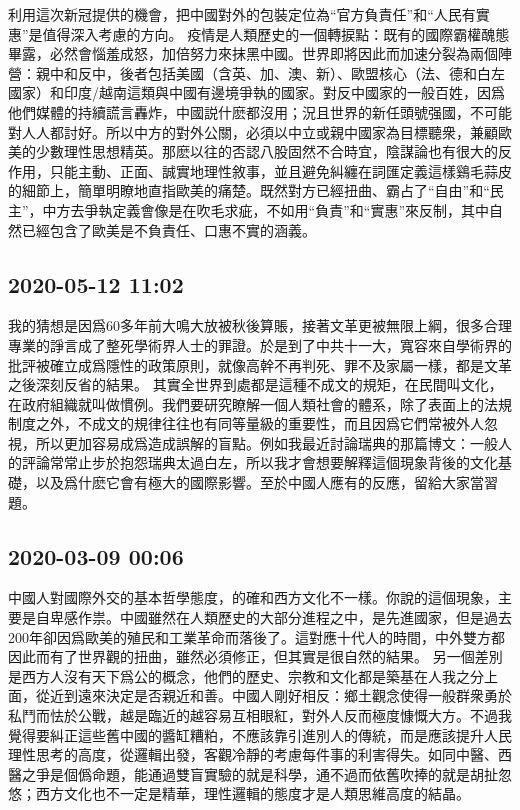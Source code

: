 \documentclass[twocolumn]{ctexart}
\begin{document}
利用這次新冠提供的機會，把中國對外的包裝定位為“官方負責任”和“人民有實惠”是值得深入考慮的方向。 
疫情是人類歷史的一個轉捩點：既有的國際霸權醜態畢露，必然會惱羞成怒，加倍努力來抹黑中國。世界即將因此而加速分裂為兩個陣營：親中和反中，後者包括美國（含英、加、澳、新）、歐盟核心（法、德和白左國家）和印度/越南這類與中國有邊境爭執的國家。對反中國家的一般百姓，因爲他們媒體的持續謊言轟炸，中國説什麽都沒用；況且世界的新任頭號强國，不可能對人人都討好。所以中方的對外公關，必須以中立或親中國家為目標聽衆，兼顧歐美的少數理性思想精英。那麽以往的否認八股固然不合時宜，陰謀論也有很大的反作用，只能主動、正面、誠實地理性敘事，並且避免糾纏在詞匯定義這樣鷄毛蒜皮的細節上，簡單明瞭地直指歐美的痛楚。既然對方已經扭曲、霸占了“自由”和“民主”，中方去爭執定義會像是在吹毛求疵，不如用“負責”和“實惠”來反制，其中自然已經包含了歐美是不負責任、口惠不實的涵義。
\subsection*{2020-05-12 11:02}

我的猜想是因爲60多年前大鳴大放被秋後算賬，接著文革更被無限上綱，很多合理專業的諍言成了整死學術界人士的罪證。於是到了中共十一大，寬容來自學術界的批評被確立成爲隱性的政策原則，就像高幹不再判死、罪不及家屬一樣，都是文革之後深刻反省的結果。 
其實全世界到處都是這種不成文的規矩，在民間叫文化，在政府組織就叫做慣例。我們要研究瞭解一個人類社會的體系，除了表面上的法規制度之外，不成文的規律往往也有同等量級的重要性，而且因爲它們常被外人忽視，所以更加容易成爲造成誤解的盲點。例如我最近討論瑞典的那篇博文：一般人的評論常常止步於抱怨瑞典太過白左，所以我才會想要解釋這個現象背後的文化基礎，以及爲什麽它會有極大的國際影響。至於中國人應有的反應，留給大家當習題。
\subsection*{2020-03-09 00:06}

中國人對國際外交的基本哲學態度，的確和西方文化不一樣。你說的這個現象，主要是自卑感作祟。中國雖然在人類歷史的大部分進程之中，是先進國家，但是過去200年卻因爲歐美的殖民和工業革命而落後了。這對應十代人的時間，中外雙方都因此而有了世界觀的扭曲，雖然必須修正，但其實是很自然的結果。
另一個差別是西方人沒有天下爲公的概念，他們的歷史、宗教和文化都是築基在人我之分上面，從近到遠來決定是否親近和善。中國人剛好相反：鄉土觀念使得一般群衆勇於私鬥而怯於公戰，越是臨近的越容易互相眼紅，對外人反而極度慷慨大方。不過我覺得要糾正這些舊中國的醬缸糟粕，不應該靠引進別人的傳統，而是應該提升人民理性思考的高度，從邏輯出發，客觀冷靜的考慮每件事的利害得失。如同中醫、西醫之爭是個僞命題，能通過雙盲實驗的就是科學，通不過而依舊吹捧的就是胡扯忽悠；西方文化也不一定是精華，理性邏輯的態度才是人類思維高度的結晶。
\end{document}
